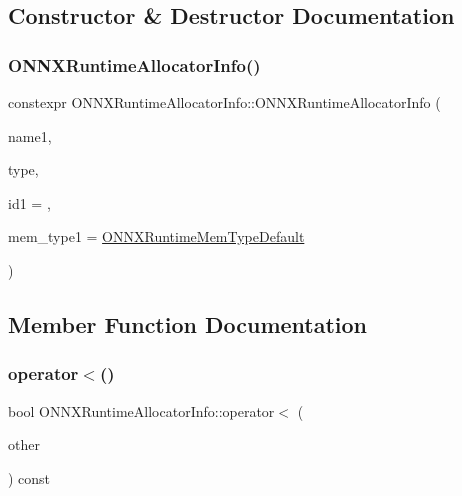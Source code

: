 \subsection{Constructor \& Destructor Documentation}
\mbox{\label{structONNXRuntimeAllocatorInfo_a4ad9957df41db317499bf85b7ac145f7}} 
\subsubsection{\texorpdfstring{O\+N\+N\+X\+Runtime\+Allocator\+Info()}{ONNXRuntimeAllocatorInfo()}}
{\footnotesize\ttfamily constexpr O\+N\+N\+X\+Runtime\+Allocator\+Info\+::\+O\+N\+N\+X\+Runtime\+Allocator\+Info (\begin{DoxyParamCaption}\item[{const char $\ast$}]{name1,  }\item[{\mbox{\hyperlink{allocator__info_8h_a2c2bd010ef8b74c81553f74c5eeb2677}{O\+N\+N\+X\+Runtime\+Allocator\+Type}}}]{type,  }\item[{int}]{id1 = {},  }\item[{\mbox{\hyperlink{allocator__info_8h_add3f8ee3ff93395704abae71c30cab18}{O\+N\+N\+X\+Runtime\+Mem\+Type}}}]{mem\+\_\+type1 = {\ttfamily \mbox{\hyperlink{allocator__info_8h_add3f8ee3ff93395704abae71c30cab18a232271cbf46c229ed40272a63af7a204}{O\+N\+N\+X\+Runtime\+Mem\+Type\+Default}}} }\end{DoxyParamCaption})\hspace{0.3cm}{\ttfamily [inline]}}



\subsection{Member Function Documentation}
\mbox{\label{structONNXRuntimeAllocatorInfo_a4184adc46c4264b7520163792bdbe559}} 
\subsubsection{\texorpdfstring{operator$<$()}{operator<()}}
{\footnotesize\ttfamily bool O\+N\+N\+X\+Runtime\+Allocator\+Info\+::operator$<$ (\begin{DoxyParamCaption}\item[{const \mbox{\hyperlink{structONNXRuntimeAllocatorInfo}{O\+N\+N\+X\+Runtime\+Allocator\+Info}} \&}]{other }\end{DoxyParamCaption}) const\hspace{0.3cm}{\ttfamily [inline]}}

